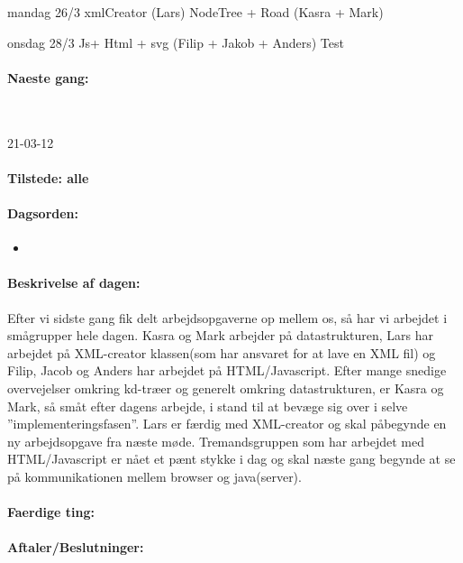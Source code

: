 \documentclass[a4paper,10pt,titlepage]{article}
\begin{document}
mandag 26/3
xmlCreator (Lars)
NodeTree + Road (Kasra + Mark)

onsdag 28/3
Js+ Html + svg (Filip + Jakob + Anders)
Test
		\paragraph{Naeste gang:}\mbox{}\\
			
			
			\begin{center}
		21-03-12
		\end{center}
		
		\paragraph{Tilstede: alle}
		\paragraph{Dagsorden:}
		\begin{itemize}
					\item 
					
		\end{itemize}
		
		\paragraph{Beskrivelse af dagen:}
		Efter vi sidste gang fik delt arbejdsopgaverne op mellem os, så har vi arbejdet i smågrupper hele dagen. 
Kasra og Mark arbejder på datastrukturen, Lars har arbejdet på XML-creator klassen(som har ansvaret for at lave en XML fil) og Filip, Jacob og Anders har arbejdet på HTML/Javascript.
Efter mange snedige overvejelser omkring kd-træer og generelt omkring datastrukturen, er Kasra og Mark, så småt efter dagens arbejde,  i stand til at bevæge sig over i selve ”implementeringsfasen”.  Lars er færdig med XML-creator og skal påbegynde en ny arbejdsopgave fra næste møde. Tremandsgruppen som har arbejdet med HTML/Javascript er nået et pænt stykke i dag og skal næste gang begynde at se på kommunikationen mellem browser og java(server).

		\paragraph{Faerdige ting:}
		
		\paragraph{Aftaler/Beslutninger:}
		
\end{document}
